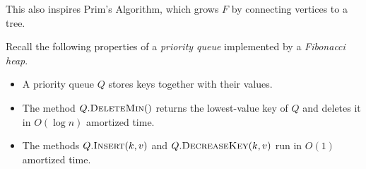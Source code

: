 This also inspires Prim's Algorithm, which grows $F$ by connecting vertices to a tree.

\begin{remark}
    Recall the following properties of a \emph{priority queue} implemented by a \emph{Fibonacci heap}.
    \begin{itemize}
        \item A priority queue $Q$ stores keys together with their values.
        \item The method $Q.\textsc{DeleteMin}()$ returns the lowest-value key of $Q$ and deletes it in $O(\log n)$ amortized time.
        \item The methods $Q.\textsc{Insert}(k, v)$ and $Q.\textsc{DecreaseKey}(k, v)$ run in $O(1)$ amortized time.
    \end{itemize}
\end{remark}

